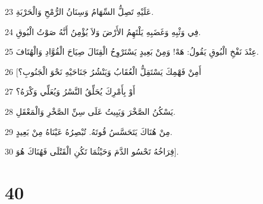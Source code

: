 \par 23 عَلَيْهِ تَصِلُّ السِّهَامُ وَسِنَانُ الرُّمْحِ وَالْحَرْبَةِ.
\par 24 فِي وَثْبِهِ وَغَضَبِهِ يَلْتَهِمُ الأَرْضَ وَلاَ يُؤْمِنُ أَنَّهُ صَوْتُ الْبُوقِ.
\par 25 عِنْدَ نَفْخِ الْبُوقِ يَقُولُ: هَهْ! وَمِنْ بَعِيدٍ يَسْتَرْوِحُ الْقِتَالَ صِيَاحَ الْقُوَّادِ وَالْهُتَافَ.
\par 26 [أَمِنْ فَهْمِكَ يَسْتَقِلُّ الْعُقَابُ وَيَنْشُرُ جَنَاحَيْهِ نَحْوَ الْجَنُوبِ؟
\par 27 أَوْ بِأَمْرِكَ يُحَلِّقُ النَّسْرُ وَيُعَلِّي وَكْرَهُ؟
\par 28 يَسْكُنُ الصَّخْرَ وَيَبِيتُ عَلَى سِنِّ الصَّخْرِ وَالْمَعْقَلِ.
\par 29 مِنْ هُنَاكَ يَتَحَسَّسُ قُوتَهُ. تُبْصِرُهُ عَيْنَاهُ مِنْ بَعِيدٍ.
\par 30 فِرَاخُهُ تَحْسُو الدَّمَ وَحَيْثُمَا تَكُنِ الْقَتْلَى فَهُنَاكَ هُوَ].

\chapter{40}

